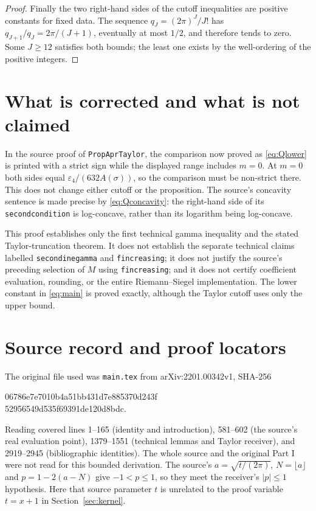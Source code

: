 \documentclass[11pt]{article}
\newcommand{\eps}{\varepsilon}
\begin{document}
\begin{proof}
Finally the two right-hand sides of the cutoff inequalities are
positive constants for fixed data. The sequence $q_J=(2\pi)^J/J!$
has $q_{J+1}/q_J=2\pi/(J+1)$, eventually at most $1/2$, and
therefore tends to zero. Some $J\ge12$ satisfies both bounds;
the least one exists by the well-ordering of the positive integers.
\end{proof}

\section{What is corrected and what is not claimed}\label{sec:limits}
In the source proof of \texttt{PropAprTaylor}, the comparison now
proved as \eqref{eq:Qlower} is printed with a strict sign while the
displayed range includes $m=0$. At $m=0$ both sides equal
$\eps_4/(632A(\sigma))$, so the comparison must be non-strict
there. This does not change either cutoff or the proposition.
The source's concavity sentence is made precise by
\eqref{eq:Qconcavity}: the right-hand side of its
\texttt{secondcondition} is log-concave, rather than its logarithm
being log-concave.

This proof establishes only the first technical gamma inequality
and the stated Taylor-truncation theorem. It does not establish
the separate technical claims labelled \texttt{secondinegamma}
and \texttt{fincreasing}; it does not justify the source's preceding
selection of $M$ using \texttt{fincreasing}; and it does not certify
coefficient evaluation, rounding, or the entire Riemann--Siegel
implementation. The lower constant in \eqref{eq:main} is proved
exactly, although the Taylor cutoff uses only the upper bound.

\section*{Source record and proof locators}
The original file used was \texttt{main.tex} from
arXiv:2201.00342v1, SHA-256
\begin{center}\small\ttfamily
06786e7e7010b4a51bb431d7e885370d243f\\
52956549d535f69391de120d8bdc.
\end{center}
Reading covered lines 1--165 (identity and introduction),
581--602 (the source's real evaluation point),
1379--1551 (technical lemmas and Taylor receiver), and
2919--2945 (bibliographic identities). The whole source and the
original Part I were not read for this bounded derivation.
The source's $a=\sqrt{t/(2\pi)}$, $N=\lfloor a\rfloor$ and
$p=1-2(a-N)$ give $-1<p\le1$, so they meet the receiver's
$|p|\le1$ hypothesis. Here that source parameter $t$ is unrelated
to the proof variable $t=x+1$ in Section~\ref{sec:kernel}.
\end{document}
